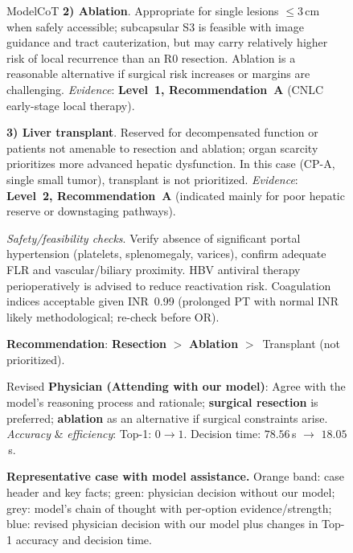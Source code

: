 \documentclass{article}
\begin{document}
\begin{figure}[t]
\begin{minipage}{0.99\linewidth}
\begin{bandbox}{ModelCoT}
  \textbf{2) Ablation}. 
  Appropriate for single lesions \(\le 3\,\mathrm{cm}\) when safely accessible; subcapsular S3 is feasible with image guidance and tract cauterization, but may carry relatively higher risk of local recurrence than an R0 resection. 
  Ablation is a reasonable alternative if surgical risk increases or margins are challenging. 
  \emph{Evidence}: \textbf{Level~1, Recommendation~A} (CNLC early-stage local therapy). 

  \textbf{3) Liver transplant}. 
  Reserved for decompensated function or patients not amenable to resection and ablation; organ scarcity prioritizes more advanced hepatic dysfunction. In this case (CP-A, single small tumor), transplant is not prioritized. 
  \emph{Evidence}: \textbf{Level~2, Recommendation~A} (indicated mainly for poor hepatic reserve or downstaging pathways).

  \medskip
  \textit{Safety/feasibility checks}. 
  Verify absence of significant portal hypertension (platelets, splenomegaly, varices), confirm adequate FLR and vascular/biliary proximity. 
  HBV antiviral therapy perioperatively is advised to reduce reactivation risk. 
  Coagulation indices acceptable given INR~0.99 (prolonged PT with normal INR likely methodological; re-check before OR). 

  \textbf{Recommendation}: \textbf{Resection} \(>\) \textbf{Ablation} \(>\) \(\,\)Transplant (not prioritized).
  \end{bandbox}

  \vspace{2pt}
  \begin{bandbox}{Revised}
  \textbf{Physician (Attending with our model)}: Agree with the model’s reasoning process and rationale; \textbf{surgical resection} is preferred; \textbf{ablation} as an alternative if surgical constraints arise. 
  \textit{Accuracy} \& \textit{efficiency}: Top-1: \(0 \rightarrow 1\). Decision time: \(78.56\)\,s \(\rightarrow\) \(18.05\)\,s.
  \end{bandbox}
\end{minipage}
\caption{\textbf{Representative case with model assistance.} 
Orange band: case header and key facts; green: physician decision without our model; grey: model's chain of thought with per-option evidence/strength; blue: revised physician decision with our model plus changes in Top-1 accuracy and decision time.}
\label{fig:case_single_en}
\end{figure}
\end{document}

